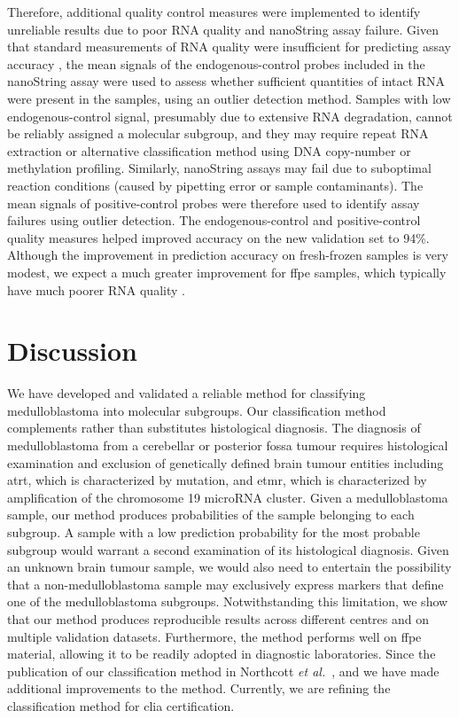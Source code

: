Therefore, additional quality control measures were implemented to identify unreliable results due to poor RNA quality and nanoString assay failure. Given that standard measurements of RNA quality were insufficient for predicting assay accuracy , the mean signals of the endogenous-control probes included in the nanoString assay were used to assess whether sufficient quantities of intact RNA were present in the samples, using an outlier detection method. Samples with low endogenous-control signal, presumably due to extensive RNA degradation, cannot be reliably assigned a molecular subgroup, and they may require repeat RNA extraction or alternative classification method using DNA copy-number or methylation profiling. Similarly, nanoString assays may fail due to suboptimal reaction conditions (caused by pipetting error or sample contaminants). The mean signals of positive-control probes were therefore used to identify assay failures using outlier detection. The endogenous-control and positive-control quality measures helped improved accuracy on the new validation set to 94\%. Although the improvement in prediction accuracy on fresh-frozen samples is very modest, we expect a much greater improvement for \gls{ffpe} samples, which typically have much poorer RNA quality .


\section{Discussion}

We have developed and validated a reliable method for classifying medulloblastoma into molecular subgroups. Our classification method complements rather than substitutes histological diagnosis. The diagnosis of medulloblastoma from a cerebellar or posterior fossa tumour requires histological examination and exclusion of genetically defined brain tumour entities including \gls{atrt}, which is characterized by  mutation, and \gls{etmr}, which is characterized by amplification of the chromosome 19 microRNA cluster. Given a medulloblastoma sample, our method produces probabilities of the sample belonging to each subgroup. A sample with a low prediction probability for the most probable subgroup would warrant a second examination of its histological diagnosis. Given an unknown brain tumour sample, we would also need to entertain the possibility that a non-medulloblastoma sample may exclusively express markers that define one of the medulloblastoma subgroups. Notwithstanding this limitation, we show that our method produces reproducible results across different centres and on multiple validation datasets. Furthermore, the method performs well on \gls{ffpe} material, allowing it to be readily adopted in diagnostic laboratories. Since the publication of our classification method in Northcott \emph{et al.}\ , and we have made additional improvements to the method. Currently, we are refining the classification method for \gls{clia} certification.

